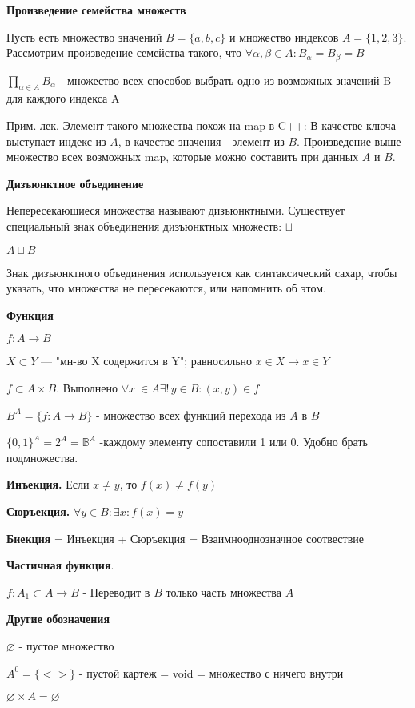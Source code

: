 \textbf{Произведение семейства множеств}

Пусть есть множество значений $B = \{a, b, c\}$  и множество индексов $A = \{1, 2, 3\}$. Рассмотрим произведение семейства такого, что $\forall \alpha, \beta \in A: B_\alpha = B_\beta = B$ 

$\prod_{\alpha\in A}{B_\alpha}$ - множество всех способов выбрать одно из возможных значений B для каждого индекса A

Прим. лек. Элемент такого множества похож на map в C++: В качестве ключа выступает индекс из $A$, в качестве значения - элемент из $B$. Произведение выше - множество всех возможных map, которые можно составить при данных $A$ и $B$.

\textbf{Дизъюнктное объединение}

Непересекающиеся множества называют дизъюнктными. Существует специальный знак объединения дизъюнктных множеств: $\sqcup$ 

$A \sqcup B$

Знак дизъюнктного объединения используется как синтаксический сахар, чтобы указать, что множества не пересекаются, или напомнить об этом.

\textbf{Функция} 

$f:A \rightarrow B$

$X \subset Y$ --- "мн-во X содержится в Y"; равносильно $x \in X \rightarrow x \in Y$

$f \subset A \times B$. Выполнено $\forall x\ \in A \exists!\,y \in B: (x,y) \in f$

$B^A = \{f:A \rightarrow B\}$ - множество всех функций перехода из $A$ в $B$

$\{0, 1\}^{A}=2^{A}=\mathbb{B}^{A}$ -каждому элементу сопоставили 1 или 0. Удобно брать подмножества.


\textbf{Инъекция.} Если $x \neq y$, то $f(x) \neq f(y)$

\textbf{Сюръекция.} $\forall y \in B: \exists x: f(x)=y$

\textbf{Биекция} = Инъекция + Сюръекция = Взаимнооднозначное соотвествие

\textbf{Частичная функция}. 

$f: A_1 \subset A \rightarrow B$ - Переводит в $B$ только часть множества $A$

\textbf{Другие обозначения}

$\varnothing$ - пустое множество

$A^0 = \{<>\}$ - пустой картеж = void = множество с ничего внутри

$\varnothing \times A = \varnothing$

